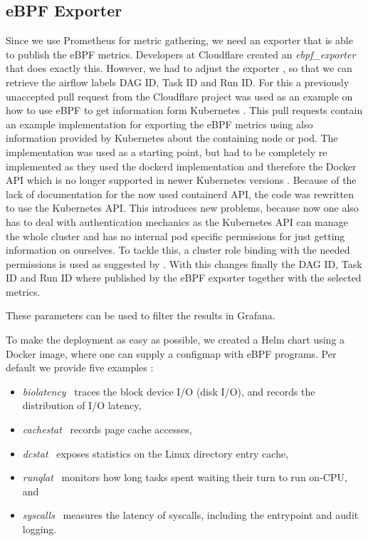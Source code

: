 \documentclass[a4paper,journal]{IEEEtran}
\begin{document}
	\subsection{eBPF Exporter}
	Since we use Prometheus for metric gathering, we need an exporter that is able to publish the eBPF metrics. Developers at Cloudflare created an \textit{ebpf\_exporter} \cite{ebpfCloudflare} that does exactly this. However, we had to adjust the exporter \cite{ebpfExporterJulian}, so that we can retrieve the airflow labels DAG ID, Task ID and Run ID. For this a previously unaccepted pull request from the Cloudflare project was used as an example on how to use eBPF to get information form Kubernetes \cite{ebpfPull75}. This pull requests contain an example implementation for exporting the eBPF metrics using also information provided by Kubernetes about the containing node or pod. The implementation was used as a starting point, but had to be completely re implemented as they used the dockerd implementation and therefore the Docker API which is no longer supported in newer Kubernetes versions \cite{kubernetesDockerDepricated}. Because of the lack of documentation for the now used containerd API, the code was rewritten to use the Kubernetes API. This introduces new problems, because now one also has to deal with authentication mechanics as the Kubernetes API can manage the whole cluster and has no internal pod specific permissions for just getting information on ourselves. To tackle this, a cluster role binding with the needed permissions is used as suggested by \cite{kubernetesRbac}. With this changes finally the DAG ID, Task ID and Run ID where published by the eBPF exporter together with the selected metrics.
	
	These parameters can be used to filter the results in Grafana.
	
	To make the deployment as easy as possible, we created a Helm chart using a Docker image, where one can supply a configmap with eBPF programs. Per default we provide five examples \cite{ebpfexporterexamples}:
	\begin{itemize}
		\item \textit{biolatency}~ traces the block device I/O (disk I/O), and records the distribution of I/O latency,
		\item \textit{cachestat}~ records page cache accesses,
		\item \textit{dcstat}~ exposes statistics on the Linux  directory  entry cache,
		\item \textit{runqlat}~ monitors how long tasks spent waiting their turn to run on-CPU, and
		\item \textit{syscalls}~ measures the latency of syscalls, including the entrypoint and audit logging.
	\end{itemize}
	
\end{document}
